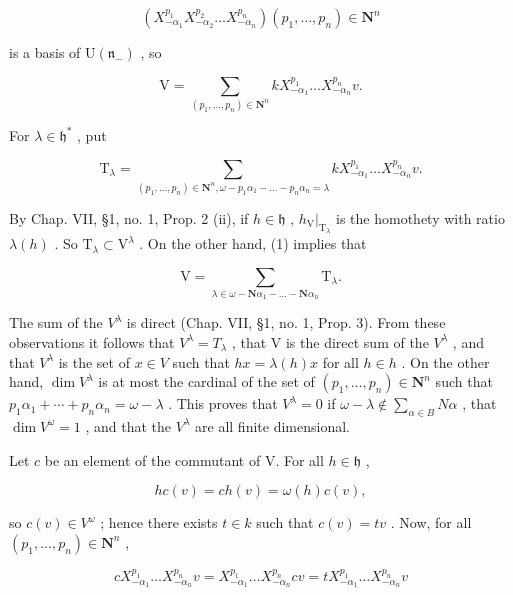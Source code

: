 \[
\left(X _ {- \alpha_ {1}} ^ {p _ {1}} X _ {- \alpha_ {2}} ^ {p _ {2}} \dots X _ {- \alpha_ {n}} ^ {p _ {n}}\right) (p _ {1}, \ldots , p _ {n}) \in \mathbf {N} ^ {n}
\]

is a basis of \(\mathrm{U}(\mathfrak{n}_{-})\) , so

\[
\mathrm{V} = \sum_ {(p _ {1}, \dots , p _ {n}) \in \mathbf {N} ^ {n}} k X _ {- \alpha_ {1}} ^ {p _ {1}} \dots X _ {- \alpha_ {n}} ^ {p _ {n}} v.\tag{1}
\]

For \(\lambda \in \mathfrak{h}^*\) , put

\[
\mathrm{T} _ {\lambda} = \sum_ {(p _ {1}, \ldots , p _ {n}) \in \mathbf {N} ^ {n}, \omega - p _ {1} \alpha_ {1} - \dots - p _ {n} \alpha_ {n} = \lambda} k X _ {- \alpha_ {1}} ^ {p _ {1}} \ldots X _ {- \alpha_ {n}} ^ {p _ {n}} v.
\]

By Chap. VII, §1, no. 1, Prop. 2 (ii), if \(h \in \mathfrak{h}\) , \(h_{\mathrm{V}}|_{\mathrm{T}_{\lambda}}\) is the homothety with ratio \(\lambda(h)\) . So \(\mathrm{T}_{\lambda} \subset \mathrm{V}^{\lambda}\) . On the other hand, (1) implies that

\[
\mathrm{V} = \sum_ {\lambda \in \omega - \mathbf {N} \alpha_ {1} - \dots - \mathbf {N} \alpha_ {n}} \mathrm{T} _ {\lambda}.
\]

The sum of the \(V^{\lambda}\) is direct (Chap. VII, §1, no. 1, Prop. 3). From these observations it follows that \(V^{\lambda} = T_{\lambda}\) , that V is the direct sum of the \(V^{\lambda}\) , and that \(V^{\lambda}\) is the set of \(x \in V\) such that \(hx = \lambda(h)x\) for all \(h \in h\) . On the other hand, \(\dim V^{\lambda}\) is at most the cardinal of the set of \((p_{1}, \ldots, p_{n}) \in \mathbf{N}^{n}\) such that \(p_{1}\alpha_{1} + \cdots + p_{n}\alpha_{n} = \omega - \lambda\) . This proves that \(V^{\lambda} = 0\) if \(\omega - \lambda \notin \sum_{\alpha \in B} N\alpha\) , that \(\dim V^{\omega} = 1\) , and that the \(V^{\lambda}\) are all finite dimensional.

Let \(c\) be an element of the commutant of V. For all \(h \in \mathfrak{h}\) ,

\[
h c (v) = c h (v) = \omega (h) c (v),
\]

so \(c(v) \in V^{\omega}\) ; hence there exists \(t \in k\) such that \(c(v) = tv\) . Now, for all \((p_1, \ldots, p_n) \in \mathbf{N}^n\) ,

\[
c X _ {- \alpha_ {1}} ^ {p _ {1}} \dots X _ {- \alpha_ {n}} ^ {p _ {n}} v = X _ {- \alpha_ {1}} ^ {p _ {1}} \dots X _ {- \alpha_ {n}} ^ {p _ {n}} c v = t X _ {- \alpha_ {1}} ^ {p _ {1}} \dots X _ {- \alpha_ {n}} ^ {p _ {n}} v
\]

